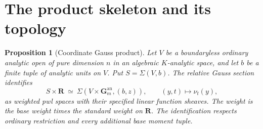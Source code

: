 \documentclass[11pt,a4paper]{article}
\newtheorem{proposition}[theorem]{Proposition}
\theoremstyle{definition}
\theoremstyle{remark}
\newcommand{\R}{\mathbf R}
\newcommand{\an}{\mathrm{an}}
\begin{document}
\section{The product skeleton and its topology}

\begin{proposition}[Coordinate Gauss product]
\label{h22:gauss-product}
Let $V$ be a boundaryless ordinary analytic open of pure dimension
$n$ in an algebraic $K$-analytic space, and let $b$ be a finite tuple
of analytic units on $V$. Put $S=\Sigma(V,b)$. The relative Gauss
section identifies
\[
 S\times\R\ \simeq\
 \Sigma(V\times\mathbf G_m^{\an},(b,z)),\qquad
              (y,t)\longmapsto\nu_t(y),
\tag{TD2}\label{h22:gauss}
\]
as weighted pwl spaces with their specified linear function sheaves.
The weight is the base weight times the standard weight on $\R$.
The identification respects ordinary restriction and every additional
base moment tuple.
\end{proposition}
\end{document}
